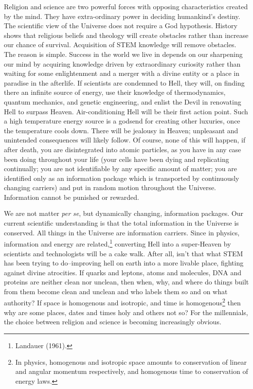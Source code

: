\begin{multicols}{2}
Religion and science are two powerful forces with opposing characteristics created by the mind. They have extra-ordinary power in deciding humankind's destiny. The scientific view of the Universe does not require a God hypothesis. History shows that religious beliefs and theology will create obstacles rather than increase our chance of survival. Acquisition of STEM knowledge will remove obstacles. The reason is simple. Success in the world we live in depends on our sharpening our mind by acquiring knowledge driven by extraordinary curiosity rather than waiting for some enlightenment and a merger with a divine entity or a place in paradise in the afterlife. If scientists are condemned to Hell, they will, on finding there an infinite source of energy, use their knowledge of thermodynamics, quantum mechanics, and genetic engineering, and enlist the Devil in renovating Hell to surpass Heaven. Air-conditioning Hell will be their first action point. Such a high temperature energy source is a godsend for creating other luxuries, once the temperature cools down. There will be jealousy in Heaven; unpleasant and unintended consequences will likely follow. Of course, none of this will happen, if after death, you are disintegrated into atomic particles, as you have in any case been doing throughout your life (your cells have been dying and replicating continually; you are not identifiable by any specific amount of matter; you are identified only as an information package which is transported by continuously changing carriers) and put in random motion throughout the Universe. Information cannot be punished or rewarded.

\vskip -2pt

We are not matter \textit{per se}, but dynamically changing, information packages. Our current scientific understanding is that the total information in the Universe is conserved. All things in the Universe are information carriers. Since in physics, information and energy are related,\footnote{Landauer (1961).} converting Hell into a super-Heaven by scientists and technologists will be a cake walk. After all, isn't that what STEM has been trying to do--improving hell on earth into a more livable place, fighting against divine atrocities. If quarks and leptons, atoms and molecules, DNA and proteins are neither clean nor unclean, then when, why, and where do things built from them become clean and unclean and who labels them so and on what authority? If space is homogenous and isotropic, and time is homogenous\footnote{In physics, homogenous and isotropic space amounts to conservation of linear and angular momentum respectively, and homogenous time to conservation of energy laws.}  then why are some places, dates and times holy and others not so? For the millennials, the choice between religion and science is becoming increasingly obvious.


\end{multicols}
